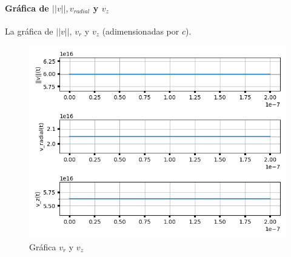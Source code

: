 \newpage 

\paragraph{Gráfica de $||v||, v_{radial}$ y $v_z$} La gráfica de $||v||$, $v_r$ y $v_z$ (adimensionadas por $c$).

\begin{figure}[H]
	\includegraphics[width=\linewidth]{figures/rel_v_mod_rad_z.png}
	\caption{Gráfica $v_r$ y $v_z$}
	\label{fig:rel_v_radial_vz}
\end{figure}
